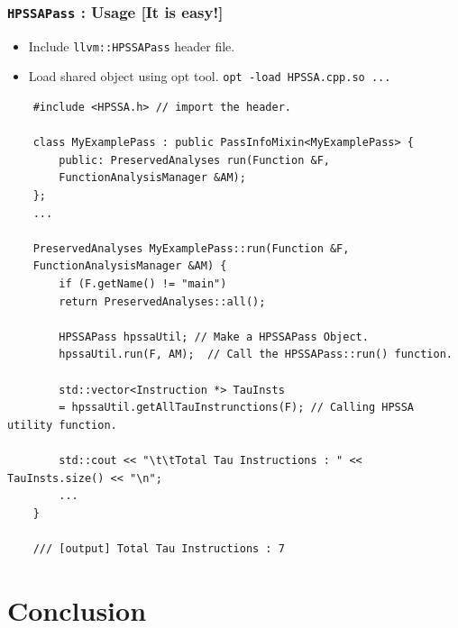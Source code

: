 \documentclass{beamer}
\begin{document}
\begin{frame}[fragile]
	\frametitle{\texttt{HPSSAPass} : Usage [It is easy!]}
	\begin{itemize}
		\item Include \texttt{llvm::HPSSAPass} header file.
		\item Load shared object using opt tool. \texttt{opt -load HPSSA.cpp.so ...} 
	\end{itemize}
	\begin{verbatim}
	#include <HPSSA.h> // import the header.
	
	class MyExamplePass : public PassInfoMixin<MyExamplePass> {
		public: PreservedAnalyses run(Function &F, 
		FunctionAnalysisManager &AM);
	};
	...
	
	PreservedAnalyses MyExamplePass::run(Function &F, 
	FunctionAnalysisManager &AM) {
		if (F.getName() != "main")
		return PreservedAnalyses::all();
		
		HPSSAPass hpssaUtil; // Make a HPSSAPass Object.
		hpssaUtil.run(F, AM);  // Call the HPSSAPass::run() function.
		
		std::vector<Instruction *> TauInsts 
		= hpssaUtil.getAllTauInstrunctions(F); // Calling HPSSA utility function.
		
		std::cout << "\t\tTotal Tau Instructions : " << TauInsts.size() << "\n";
		...
	}
	
	/// [output] Total Tau Instructions : 7 
	\end{verbatim}
\end{frame}

\section{Conclusion}
\end{document}
